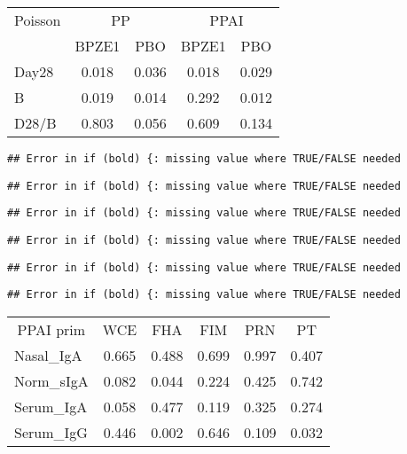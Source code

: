 \documentclass[
]{article}
\begin{document}
\begin{tabular}{>{}l|>{}c|>{}c|>{}c|c}
\hline
\multicolumn{1}{c|}{Poisson} & \multicolumn{2}{c|}{PP} & \multicolumn{2}{c}{PPAI} \\
\cline{1-1} \cline{2-3} \cline{4-5}
  & BPZE1 & PBO & BPZE1 & PBO\\
\hline
Day28 & 0.018 & 0.036 & 0.018 & 0.029\\
\hline
B & 0.019 & 0.014 & 0.292 & 0.012\\
\hline
D28/B & 0.803 & 0.056 & 0.609 & 0.134\\
\hline
\end{tabular}

\begin{verbatim}
## Error in if (bold) {: missing value where TRUE/FALSE needed
\end{verbatim}

\begin{verbatim}
## Error in if (bold) {: missing value where TRUE/FALSE needed
\end{verbatim}

\begin{verbatim}
## Error in if (bold) {: missing value where TRUE/FALSE needed
\end{verbatim}

\begin{verbatim}
## Error in if (bold) {: missing value where TRUE/FALSE needed
\end{verbatim}

\begin{verbatim}
## Error in if (bold) {: missing value where TRUE/FALSE needed
\end{verbatim}

\begin{verbatim}
## Error in if (bold) {: missing value where TRUE/FALSE needed
\end{verbatim}

\begin{tabular}{>{}l|>{}c|>{}c|>{}c|>{}c|c}
\hline
\multicolumn{1}{c|}{PPAI prim} & \multicolumn{1}{c|}{WCE} & \multicolumn{1}{c|}{FHA} & \multicolumn{1}{c|}{FIM} & \multicolumn{1}{c|}{PRN} & \multicolumn{1}{c}{PT} \\
\cline{1-1} \cline{2-2} \cline{3-3} \cline{4-4} \cline{5-5} \cline{6-6}
Nasal\_IgA & 0.665 & 0.488 & 0.699 & 0.997 & 0.407\\
\hline
Norm\_sIgA & 0.082 & 0.044 & 0.224 & 0.425 & 0.742\\
\hline
Serum\_IgA & 0.058 & 0.477 & 0.119 & 0.325 & 0.274\\
\hline
Serum\_IgG & 0.446 & 0.002 & 0.646 & 0.109 & 0.032\\
\hline
\end{tabular}
\end{document}
